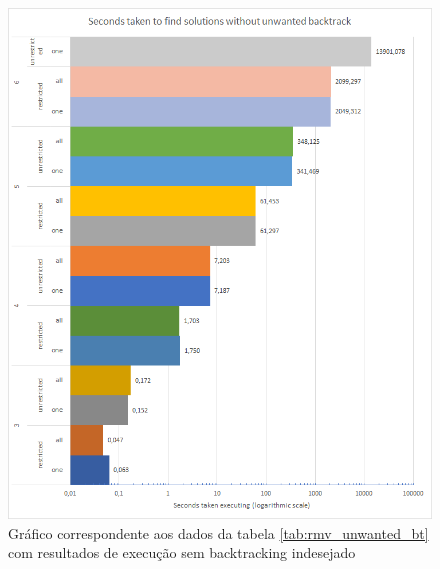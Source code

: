 \begin{figure}[ht]
\centering
\includegraphics[width=\textwidth]{figuras/graphs/without_unwanted_bt.png}
\caption{Gráfico correspondente aos dados da tabela \ref{tab:rmv_unwanted_bt} com resultados de execução sem backtracking indesejado}
\label{gph:unwanted_bt}
\end{figure}